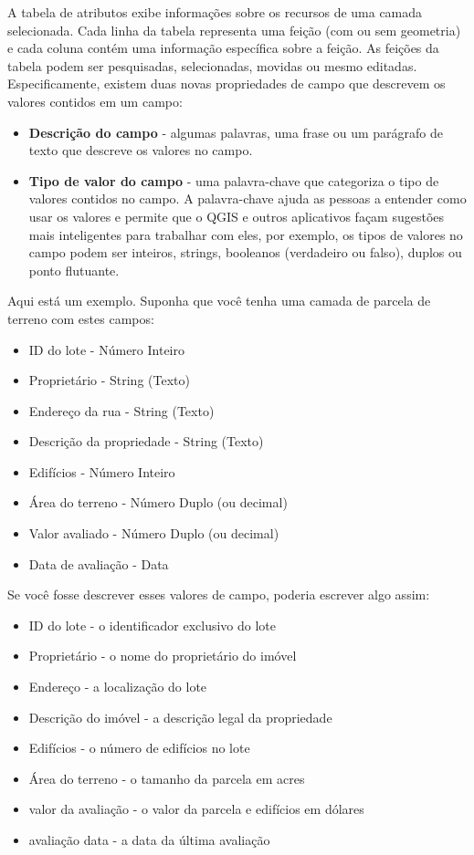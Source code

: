 \documentclass[
  portuguese,
]{krantz}
\providecommand{\tightlist}{%
  \setlength{\itemsep}{0pt}\setlength{\parskip}{0pt}}
\begin{document}
A tabela de atributos exibe informações sobre os recursos de uma camada selecionada. Cada linha da tabela representa uma feição (com ou sem geometria) e cada coluna contém uma informação específica sobre a feição. As feições da tabela podem ser pesquisadas, selecionadas, movidas ou mesmo editadas. Especificamente, existem duas novas propriedades de campo que descrevem os valores contidos em um campo:

\begin{itemize}
\tightlist
\item
  \textbf{Descrição do campo} - algumas palavras, uma frase ou um parágrafo de texto que descreve os valores no campo.
\item
  \textbf{Tipo de valor do campo} - uma palavra-chave que categoriza o tipo de valores contidos no campo. A palavra-chave ajuda as pessoas a entender como usar os valores e permite que o QGIS e outros aplicativos façam sugestões mais inteligentes para trabalhar com eles, por exemplo, os tipos de valores no campo podem ser inteiros, strings, booleanos (verdadeiro ou falso), duplos ou ponto flutuante.
\end{itemize}

Aqui está um exemplo. Suponha que você tenha uma camada de parcela de terreno com estes campos:

\begin{itemize}
\tightlist
\item
  ID do lote - Número Inteiro
\item
  Proprietário - String (Texto)
\item
  Endereço da rua - String (Texto)
\item
  Descrição da propriedade - String (Texto)
\item
  Edifícios - Número Inteiro
\item
  Área do terreno - Número Duplo (ou decimal)
\item
  Valor avaliado - Número Duplo (ou decimal)
\item
  Data de avaliação - Data
\end{itemize}

Se você fosse descrever esses valores de campo, poderia escrever algo assim:

\begin{itemize}
\tightlist
\item
  ID do lote - o identificador exclusivo do lote
\item
  Proprietário - o nome do proprietário do imóvel
\item
  Endereço - a localização do lote
\item
  Descrição do imóvel - a descrição legal da propriedade
\item
  Edifícios - o número de edifícios no lote
\item
  Área do terreno - o tamanho da parcela em acres
\item
  valor da avaliação - o valor da parcela e edifícios em dólares
\item
  avaliação data - a data da última avaliação
\end{itemize}
\end{document}
